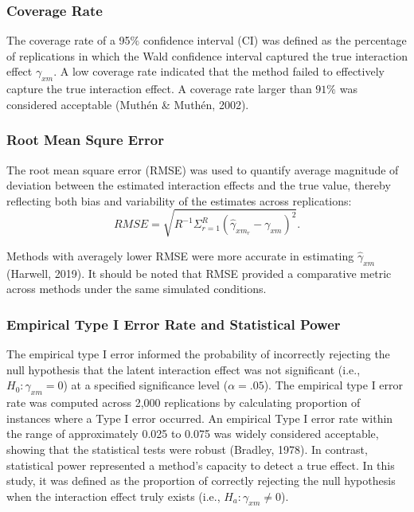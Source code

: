\documentclass[
  man]{apa6}
\begin{document}
\subsubsection{Coverage Rate}\label{coverage-rate}

The coverage rate of a 95\(\%\) confidence interval (CI) was defined as the percentage of replications in which the Wald confidence interval captured the true interaction effect \(\gamma_{xm}\). A low coverage rate indicated that the method failed to effectively capture the true interaction effect. A coverage rate larger than \(91\%\) was considered acceptable (Muthén \& Muthén, 2002).

\subsubsection{Root Mean Squre Error}\label{root-mean-squre-error}

The root mean square error (RMSE) was used to quantify average magnitude of deviation between the estimated interaction effects and the true value, thereby reflecting both bias and variability of the estimates across replications:
\begin{equation}
RMSE = \sqrt{R^{-1}\Sigma^{R}_{r = 1}(\hat{\gamma}_{xm_{r}} - \gamma_{xm})^2}.
\end{equation}

Methods with averagely lower RMSE were more accurate in estimating \(\hat{\gamma}_{xm}\) (Harwell, 2019). It should be noted that RMSE provided a comparative metric across methods under the same simulated conditions.

\subsubsection{Empirical Type I Error Rate and Statistical Power}\label{empirical-type-i-error-rate-and-statistical-power}

The empirical type I error informed the probability of incorrectly rejecting the null hypothesis that the latent interaction effect was not significant (i.e., \(H_{0}: \gamma_{xm} = 0\)) at a specified significance level (\(\alpha = .05\)). The empirical type I error rate was computed across 2,000 replications by calculating proportion of instances where a Type I error occurred. An empirical Type I error rate within the range of approximately 0.025 to 0.075 was widely considered acceptable, showing that the statistical tests were robust (Bradley, 1978). In contrast, statistical power represented a method's capacity to detect a true effect. In this study, it was defined as the proportion of correctly rejecting the null hypothesis when the interaction effect truly exists (i.e., \(H_{a}: \gamma_{xm} \neq 0\)).
\end{document}
